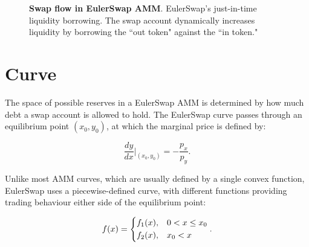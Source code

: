 \documentclass{article}
\begin{document}
\bigskip
\begin{figure}[h]
    \centering
    \caption{\textbf{Swap flow in EulerSwap AMM}. EulerSwap’s just-in-time liquidity borrowing. The swap account dynamically increases liquidity by borrowing the ``out token" against the ``in token."}
    \label{fig:EulerSwap_liquidity}
\end{figure}

\section{Curve}

The space of possible reserves in a EulerSwap AMM is determined by how much debt a swap account is allowed to hold. The EulerSwap curve passes through an equilibrium point $(x_0, y_0)$, at which the marginal price is defined by:

\begin{equation}
\frac{dy}{dx} \Big|_{(x_0, y_0)} = -\frac{p_x}{p_y}.
\end{equation}

Unlike most AMM curves, which are usually defined by a single convex function, EulerSwap uses a piecewise-defined curve, with different functions providing trading behaviour either side of the equilibrium point:

\begin{equation}
    \label{eq:fx-main}
    f(x) =
    \begin{dcases}
        f_1(x), 
        & 0 < x \leq x_0 \\
        f_2(x), 
        & x_0 < x
    \end{dcases}.
\end{equation}
\end{document}
